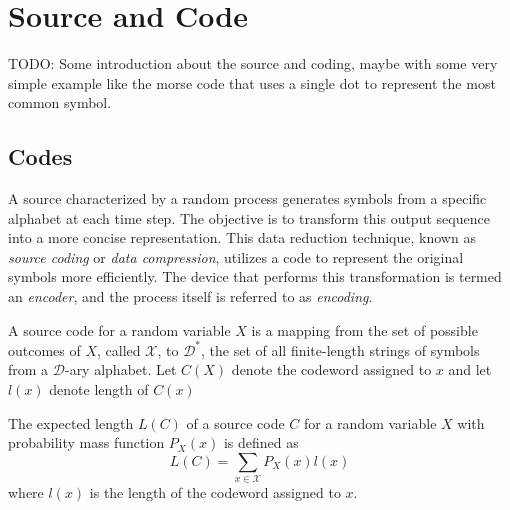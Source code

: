 \section{Source and Code} \label{sec:source_and_codes}

TODO: Some introduction about the source and coding, maybe with some very simple example like the morse code that uses a single dot to represent the most common symbol.


\subsection{Codes}

A source characterized by a random process generates symbols from a specific alphabet at each time step. The objective is to transform this output sequence into a more concise representation. This data reduction technique, known as \emph{source coding} or \emph{data compression}, utilizes a code to represent the original symbols more efficiently. The device that performs this transformation is termed an \emph{encoder}, and the process itself is referred to as \emph{encoding}. \cite{han2002mathematics}

\begin{definition}\label{def:code}
    A source code for a random variable $X$ is a mapping from the set of possible outcomes of $X$, called $\mathcal{X}$, to $\mathcal{D}^*$, the set of all finite-length strings of symbols from a $\mathcal{D}$-ary alphabet. Let $C(X)$ denote the codeword assigned to $x$ and let $l(x)$ denote length of $C(x)$
\end{definition}

\begin{definition}\label{def:expected_length}
    The expected length $L(C)$ of a source code $C$ for a random variable $X$ with probability mass function $P_X(x)$ is defined as
    \begin{equation}
        L(C) = \sum_{x\in\mathcal{X}} P_X(x)l(x)
    \end{equation}
    where $l(x)$ is the length of the codeword assigned to $x$.
\end{definition}

